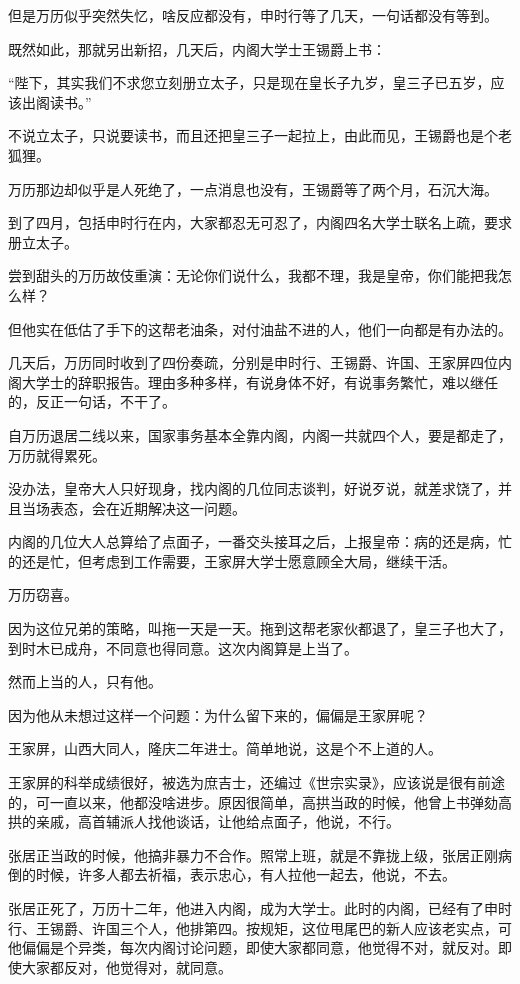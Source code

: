 \begin{multicols}{\theparacolNo}
		但是万历似乎突然失忆，啥反应都没有，申时行等了几天，一句话都没有等到。

		既然如此，那就另出新招，几天后，内阁大学士王锡爵上书：

		“陛下，其实我们不求您立刻册立太子，只是现在皇长子九岁，皇三子已五岁，应该出阁读书。”

		不说立太子，只说要读书，而且还把皇三子一起拉上，由此而见，王锡爵也是个老狐狸。

		万历那边却似乎是人死绝了，一点消息也没有，王锡爵等了两个月，石沉大海。

		到了四月，包括申时行在内，大家都忍无可忍了，内阁四名大学士联名上疏，要求册立太子。

		尝到甜头的万历故伎重演：无论你们说什么，我都不理，我是皇帝，你们能把我怎么样？

		但他实在低估了手下的这帮老油条，对付油盐不进的人，他们一向都是有办法的。

		几天后，万历同时收到了四份奏疏，分别是申时行、王锡爵、许国、王家屏四位内阁大学士的辞职报告。理由多种多样，有说身体不好，有说事务繁忙，难以继任的，反正一句话，不干了。

		自万历退居二线以来，国家事务基本全靠内阁，内阁一共就四个人，要是都走了，万历就得累死。

		没办法，皇帝大人只好现身，找内阁的几位同志谈判，好说歹说，就差求饶了，并且当场表态，会在近期解决这一问题。

		内阁的几位大人总算给了点面子，一番交头接耳之后，上报皇帝：病的还是病，忙的还是忙，但考虑到工作需要，王家屏大学士愿意顾全大局，继续干活。

		万历窃喜。

		因为这位兄弟的策略，叫拖一天是一天。拖到这帮老家伙都退了，皇三子也大了，到时木已成舟，不同意也得同意。这次内阁算是上当了。

		然而上当的人，只有他。

		因为他从未想过这样一个问题：为什么留下来的，偏偏是王家屏呢？

		王家屏，山西大同人，隆庆二年进士。简单地说，这是个不上道的人。

		王家屏的科举成绩很好，被选为庶吉士，还编过《世宗实录》，应该说是很有前途的，可一直以来，他都没啥进步。原因很简单，高拱当政的时候，他曾上书弹劾高拱的亲戚，高首辅派人找他谈话，让他给点面子，他说，不行。

		张居正当政的时候，他搞非暴力不合作。照常上班，就是不靠拢上级，张居正刚病倒的时候，许多人都去祈福，表示忠心，有人拉他一起去，他说，不去。

		张居正死了，万历十二年，他进入内阁，成为大学士。此时的内阁，已经有了申时行、王锡爵、许国三个人，他排第四。按规矩，这位甩尾巴的新人应该老实点，可他偏偏是个异类，每次内阁讨论问题，即使大家都同意，他觉得不对，就反对。即使大家都反对，他觉得对，就同意。


\end{multicols}
